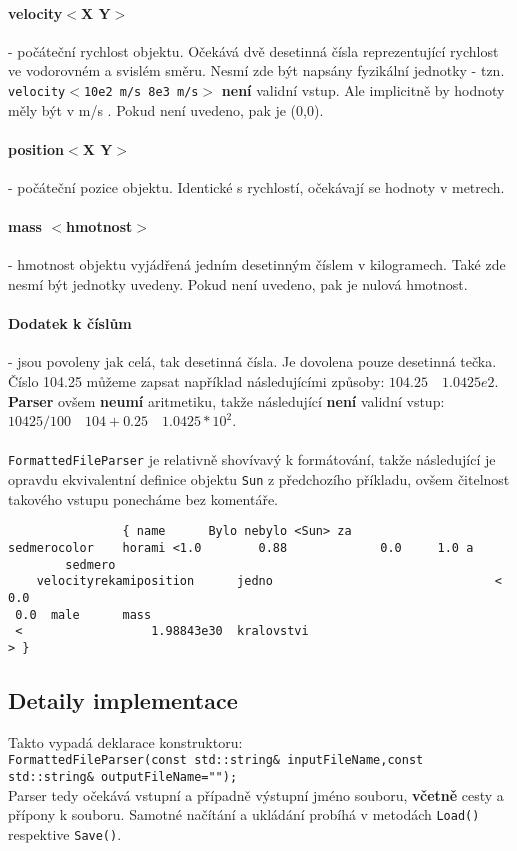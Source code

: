\paragraph{velocity$ < $X Y$ > $} - počáteční rychlost objektu. Očekává dvě desetinná čísla reprezentující rychlost ve vodorovném a svislém směru. Nesmí zde být napsány fyzikální jednotky - tzn. \texttt{velocity$ < $10e2 m/s 8e3 m/s$ > $} \textbf{není} validní vstup. Ale implicitně by hodnoty měly být v m/s . Pokud není uvedeno, pak je (0,0).
\paragraph{position$ < $X Y$ > $} - počáteční pozice objektu. Identické s rychlostí, očekávají se hodnoty v metrech.
\paragraph{mass $ < $hmotnost$ > $ } - hmotnost objektu vyjádřená jedním desetinným číslem v kilogramech. Také zde nesmí být jednotky uvedeny. Pokud není uvedeno, pak je nulová hmotnost.
\paragraph{Dodatek k číslům} - jsou povoleny jak celá, tak desetinná čísla. Je dovolena pouze desetinná tečka. Číslo 104.25 můžeme zapsat například následujícími způsoby: $ 104.25 \quad 1.0425e2$.
\textbf{Parser} ovšem \textbf{neumí} aritmetiku, takže následující \textbf{není} validní vstup: $ 10425/100 \quad 104 + 0.25 \quad 1.0425 * 10^2 $.
\paragraph{}
\texttt{FormattedFileParser} je relativně shovívavý k formátování, takže následující je opravdu ekvivalentní definice objektu \texttt{Sun} z předchozího příkladu, ovšem čitelnost takového vstupu ponecháme bez komentáře. 
\begin{lstlisting}
				{ name		Bylo nebylo	<Sun> za 
sedmerocolor	horami <1.0 	   0.88 			0.0 	1.0 a
 		sedmero
	velocityrekamiposition		jedno								<
0.0 
 0.0  male 		mass	
 <					1.98843e30  kralovstvi
> }

\end{lstlisting}

\subsection{Detaily implementace}
Takto vypadá deklarace konstruktoru: \\
\lstinline|FormattedFileParser(const std::string& inputFileName,const std::string& outputFileName="");|\\
Parser tedy očekává vstupní a případně výstupní jméno souboru,\textbf{ včetně} cesty a přípony k souboru. Samotné načítání a ukládání probíhá v metodách \texttt{Load()} respektive \texttt{Save()}.

